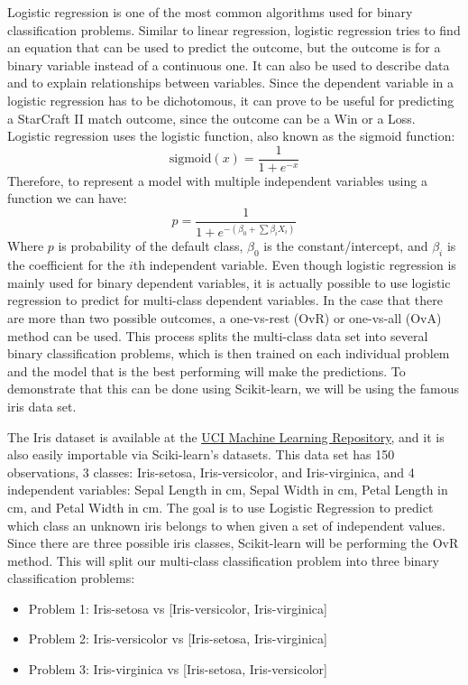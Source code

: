\documentclass[a4paper,12pt]{report}
\newcommand{\link}[2]{\hyperlink{#1}{\underline{#2}}}
\begin{document}
Logistic regression is one of the most common algorithms used for binary classification problems. Similar to linear regression, logistic regression tries to find an equation that can be used to predict the outcome, but the outcome is for a binary variable instead of a continuous one. It can also be used to describe data and to explain relationships between variables. Since the dependent variable in a logistic regression  has to be dichotomous, it can prove to be useful for predicting a StarCraft II match outcome, since the outcome can be a Win or a Loss. Logistic regression uses the logistic function, also known as the sigmoid function:
$$\text{sigmoid}(x) = \frac{1}{1+e^{-x}}$$
Therefore, to represent a model with multiple independent variables using a function we can have:
$$p = \frac{1}{1+e^{-(\beta_0+\sum\beta_iX_i)}}$$
Where $p$ is probability of the default class, $\beta_0$ is the constant/intercept, and $\beta_i$ is the coefficient for the $i$th independent variable. Even though logistic regression is mainly used for binary dependent variables, it is actually possible to use logistic regression to predict for multi-class dependent variables. In the case that there are more than two possible outcomes, a one-vs-rest (OvR) or one-vs-all (OvA) method can be used. This process splits the multi-class data set into several binary classification problems, which is then trained on each individual problem and the model that is the best performing will make the predictions. To demonstrate that this can be done using Scikit-learn, we will be using the famous iris data set.

The Iris dataset is available at the \link{https://archive.ics.uci.edu/ml/datasets/iris}{UCI Machine Learning Repository}, and it is also easily importable via Sciki-learn’s datasets. This data set has 150 observations, 3 classes: Iris-setosa, Iris-versicolor, and Iris-virginica, and 4 independent variables: Sepal Length in cm, Sepal Width in cm, Petal Length in cm, and Petal Width in cm. The goal is to use Logistic Regression to predict which class an unknown iris belongs to when given a set of independent values. Since there are three possible iris classes, Scikit-learn will be performing the OvR method. This will split our multi-class classification problem into three binary classification problems:

\begin{itemize}[,]
    \setlength\itemsep{-.1cm}
    \item Problem 1: Iris-setosa vs [Iris-versicolor, Iris-virginica]
    \item Problem 2: Iris-versicolor vs [Iris-setosa, Iris-virginica]
    \item Problem 3: Iris-virginica vs [Iris-setosa, Iris-versicolor]
\end{itemize}
 
\end{document}
